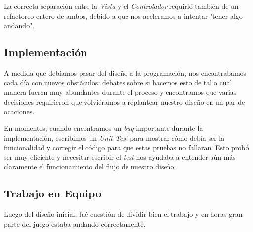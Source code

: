\documentclass[a4paper,12pt,titlepage]{article}
\begin{document}
La correcta separación entre la \emph{Vista} y el \emph{Controlador} requirió también de un refactoreo entero de ambos, debido a que nos aceleramos a intentar "tener algo andando".

\subsection{Implementación}

A medida que debíamos pasar del diseño a la programación, nos encontrabamos cada día con nuevos obstáculos: debates sobre si hacemos esto de tal o cual manera fueron muy abundantes durante el proceso y encontramos que varias decisiones requirieron que volviéramos a replantear nuestro diseño en un par de ocaciones.

En momentos, cuando encontramos un \emph{bug} importante durante la implementación, escribimos un \emph{Unit Test} para mostrar cómo debía ser la funcionalidad y corregir el código para que estas pruebas no fallaran. Esto probó ser muy eficiente y necesitar escribir el \emph{test} nos ayudaba a entender aún más claramente el funcionamiento del flujo de nuestro diseño.

\subsection{Trabajo en Equipo}

Luego del diseño inicial, fué cuestión de dividir bien el trabajo y en horas gran parte del juego estaba andando correctamente. 
\end{document}
